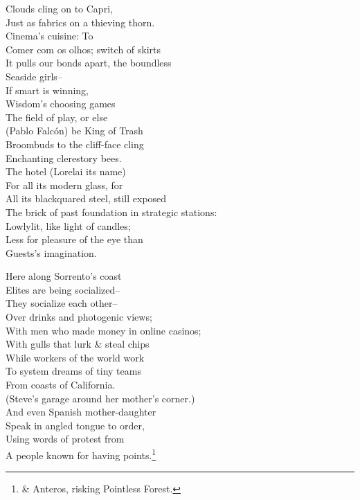 Clouds cling on to Capri, \\
Just as fabrics on a thieving thorn. \\
Cinema's cuisine: To \\
Comer com os olhos; switch of skirts \\
It pulls our bonds apart, the boundless \\
Seaside girls-- \\
If smart is winning, \\
Wisdom's choosing games \\
The field of play, or else \\
(Pablo Falcón) be King of Trash \\

Broombuds to the cliff-face cling \\
Enchanting clerestory bees. \\
The hotel (Lorelai its name) \\
For all its modern glass, for \\
All its blackquared steel, still exposed \\
The brick of past foundation in strategic stations: \\
Lowlylit, like light of candles; \\
Less for pleasure of the eye than \\
Guests's imagination.

Here along Sorrento's coast \\
Elites are being socialized-- \\
They socialize each other-- \\
Over drinks and photogenic views; \\
With men who made money in online casinos; \\
With gulls that lurk \& steal chips \\
While workers of the world work \\
To system dreams of tiny teams \\
From coasts of California. \\
(Steve's garage around her mother's corner.) \\
And even Spanish mother-daughter \\
Speak in angled tongue to order, \\
Using words of protest from \\
A people known for having points.\footnote{\& Anteros, risking Pointless Forest.} 